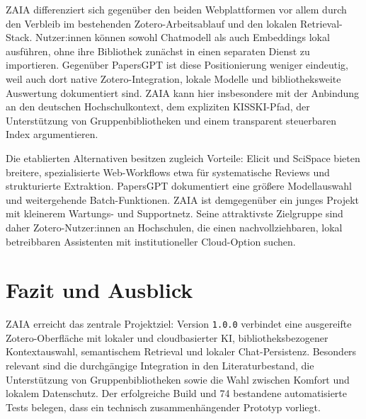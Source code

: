 \documentclass[11pt,a4paper,oneside,parskip=half]{scrartcl}
\begin{document}
ZAIA differenziert sich gegenüber den beiden Webplattformen vor allem durch den
Verbleib im bestehenden Zotero-Arbeitsablauf und den lokalen Retrieval-Stack.
Nutzer:innen können sowohl Chatmodell als auch Embeddings lokal ausführen, ohne
ihre Bibliothek zunächst in einen separaten Dienst zu importieren. Gegenüber
PapersGPT ist diese Positionierung weniger eindeutig, weil auch dort native
Zotero-Integration, lokale Modelle und bibliotheksweite Auswertung dokumentiert
sind. ZAIA kann hier insbesondere mit der Anbindung an den deutschen
Hochschulkontext, dem expliziten KISSKI-Pfad, der Unterstützung von
Gruppenbibliotheken und einem transparent steuerbaren Index argumentieren.

Die etablierten Alternativen besitzen zugleich Vorteile: Elicit und SciSpace
bieten breitere, spezialisierte Web-Workflows etwa für systematische Reviews und
strukturierte Extraktion. PapersGPT dokumentiert eine größere Modellauswahl und
weitergehende Batch-Funktionen. ZAIA ist demgegenüber ein junges Projekt mit
kleinerem Wartungs- und Supportnetz. Seine attraktivste Zielgruppe sind daher
Zotero-Nutzer:innen an Hochschulen, die einen nachvollziehbaren, lokal
betreibbaren Assistenten mit institutioneller Cloud-Option suchen.

\section{Fazit und Ausblick}

ZAIA erreicht das zentrale Projektziel: Version \texttt{1.0.0} verbindet eine
ausgereifte Zotero-Oberfläche mit lokaler und cloudbasierter KI,
bibliotheksbezogener Kontextauswahl, semantischem Retrieval und lokaler
Chat-Persistenz. Besonders relevant sind die durchgängige Integration in den
Literaturbestand, die Unterstützung von Gruppenbibliotheken sowie die Wahl
zwischen Komfort und lokalem Datenschutz. Der erfolgreiche Build und 74
bestandene automatisierte Tests belegen, dass ein technisch zusammenhängender
Prototyp vorliegt.
\end{document}
